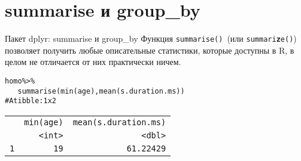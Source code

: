 \section{summarise и group\_by}
\begin{frame}{Пакет dplyr: summarise и group\_by}
Функция \scriptsize\verb"summarise()"\normalsize\ (или \scriptsize\texttt{summari\textbf{\alert{z}}e()}\normalsize) позволяет получить любые описательные статистики, которые доступны в R, в целом не отличается от них практически ничем.
\scriptsize
\begin{alltt}
homo \%>\%\\
\ \ \ \alert{summarise}(min(age), mean(s.duration.ms)) \bigskip\\
\# A tibble: 1 x 2\\
\begin{tabular}{rrr}
&  min(age) & mean(s.duration.ms)\\
&     <int>             &  <dbl>\\
1  &     19  &          61.22429 \\
\end{tabular}
\end{alltt}
\normalsize
\end{frame}
